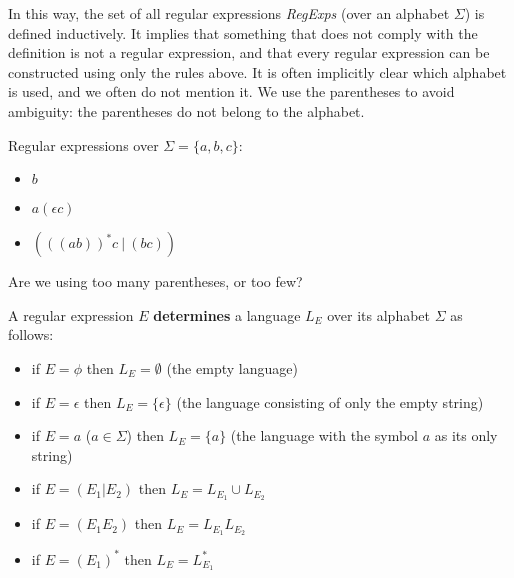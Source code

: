 In this way, the set of all regular expressions {\em RegExps} (over an
alphabet $\Sigma$) is defined inductively. It implies that something
that does not comply with the definition is not a regular expression,
and that every regular expression can be constructed using only the
rules above.
%
It is often implicitly clear which alphabet is used, and we often do
not mention it.
%
We use the parentheses to avoid ambiguity: the parentheses do not belong to
the alphabet.

\begin{example}
Regular expressions over $\Sigma = \{a,b,c\}$:
\begin{itemize}
\item $b$
\item $a(\epsilon c)$
\item $(((ab))^*c~|~(bc))$
\end{itemize}
\end{example}

Are we using too many parentheses, or too few?

\begin{definition}
	A regular expression $E$ {\bf determines} a
	language $L_E$ over its alphabet $\Sigma$ as follows:
	\begin{itemize}
		\item if $E = \phi$ then $L_E = \emptyset$ (the empty language)
		\item if $E = \epsilon$ then $L_E = \{\epsilon\}$ (the language consisting of only the empty string)
		\item if $E = a$ ($a \in \Sigma$) then $L_E = \{a\}$ (the language with
		the symbol $a$ as its only string)
		\item if $E = (E_1 | E_2)$ then $L_E = L_{E_1} \cup L_{E_2}$
		\item if $E = (E_1E_2)$ then $L_E = L_{E_1}L_{E_2}$
		\item if $E = (E_1)^*$ then $L_E = L_{E_1}^*$
	\end{itemize}
\end{definition}

